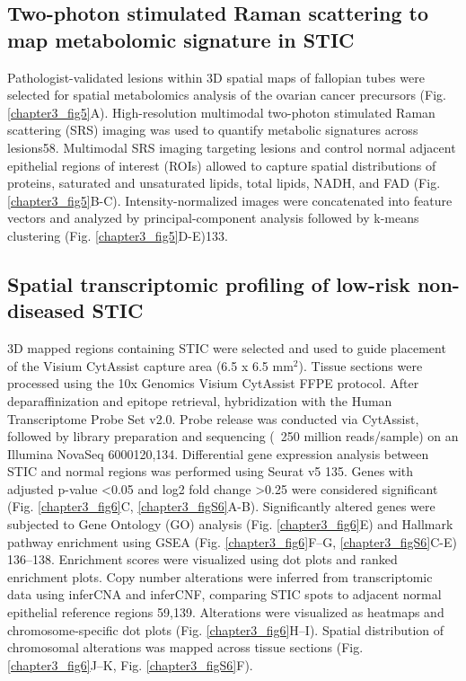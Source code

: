 \begin{refsection}
    \subsection{Two-photon stimulated Raman scattering to map metabolomic signature in STIC}
    Pathologist-validated lesions within 3D spatial maps of fallopian tubes were selected for spatial metabolomics analysis of the ovarian cancer precursors (Fig. \ref{chapter3_fig5}A). High-resolution multimodal two-photon stimulated Raman scattering (SRS) imaging was used to quantify metabolic signatures across lesions\cite{Zhang2024Multi}58. Multimodal SRS imaging targeting lesions and control normal adjacent epithelial regions of interest (ROIs) allowed to capture spatial distributions of proteins, saturated and unsaturated lipids, total lipids, NADH, and FAD (Fig. \ref{chapter3_fig5}B-C). Intensity-normalized images were concatenated into feature vectors and analyzed by principal-component analysis followed by k-means clustering (Fig. \ref{chapter3_fig5}D-E)\cite{Ikotun2023K}133.
    
    \subsection{Spatial transcriptomic profiling of low-risk non-diseased STIC }
    3D mapped regions containing STIC were selected and used to guide placement of the Visium CytAssist capture area (6.5 x 6.5 mm$^2$). Tissue sections were processed using the 10x Genomics Visium CytAssist FFPE protocol. After deparaffinization and epitope retrieval, hybridization with the Human Transcriptome Probe Set v2.0. Probe release was conducted via CytAssist, followed by library preparation and sequencing (~250 million reads/sample) on an Illumina NovaSeq 6000\cite{Johnson2025Human,Bell2024PanIN}120,134.
    Differential gene expression analysis between STIC and normal regions was performed using Seurat v5 135. Genes with adjusted p-value <0.05 and log2 fold change >0.25 were considered significant (Fig. \ref{chapter3_fig6}C, \ref{chapter3_figS6}A-B). Significantly altered genes were subjected to Gene Ontology (GO) analysis (Fig.  \ref{chapter3_fig6}E) and Hallmark pathway enrichment using GSEA (Fig. \ref{chapter3_fig6}F–G, \ref{chapter3_figS6}C-E)\cite{Subramanian2005Gene,Ashburner2000Gene,Aleksander2023Gene} 136–138. Enrichment scores were visualized using dot plots and ranked enrichment plots. Copy number alterations were inferred from transcriptomic data using inferCNA and inferCNF, comparing STIC spots to adjacent normal epithelial reference regions\cite{Patel2014Single,Timothyinfercnv} 59,139. Alterations were visualized as heatmaps and chromosome-specific dot plots (Fig.  \ref{chapter3_fig6}H–I). Spatial distribution of chromosomal alterations was mapped across tissue sections (Fig.  \ref{chapter3_fig6}J–K, Fig.  \ref{chapter3_figS6}F).
    

\end{refsection}
